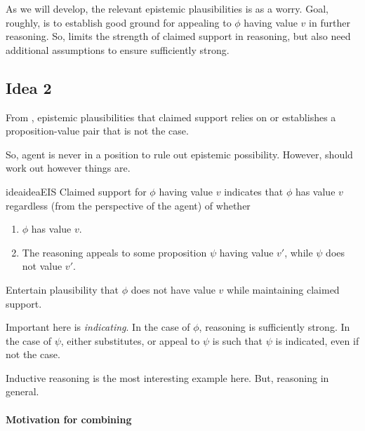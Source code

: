 \begin{note}
  As we will develop, the relevant epistemic plausibilities is as a worry.
  Goal, roughly, is to establish good ground for appealing to \(\phi\) having value \(v\) in further reasoning.
  So, \ideaCSA{} limits the strength of claimed support in reasoning, but also need additional assumptions to ensure sufficiently strong.
\end{note}

\subsection{Idea 2}
\label{sec:idea-2}

\begin{note}[]
  From \ideaCSA{}, epistemic plausibilities that claimed support relies on or establishes a proposition-value pair that is not the case.

  So, agent is never in a position to rule out epistemic possibility.
  However, should work out however things are.

  \begin{restatable}{idea}{ideaEIS}
    \label{idea:eiS}
    Claimed support for \(\phi\) having value \(v\) indicates that \(\phi\) has value \(v\) regardless (from the perspective of the agent) of whether
    \begin{enumerate}
    \item \(\phi\) has value \(v\).
    \item The reasoning appeals to some proposition \(\psi\) having value \(v'\), while \(\psi\) does not value \(v'\).
    \end{enumerate}
    \vspace{-\baselineskip}
  \end{restatable}

  Entertain plausibility that \(\phi\) does not have value \(v\) while maintaining claimed support.
\end{note}

\begin{note}
  Important here is \emph{indicating}.
  In the case of \(\phi\), reasoning is sufficiently strong.
  In the case of \(\psi\), either substitutes, or appeal to \(\psi\) is such that \(\psi\) is indicated, even if not the case.

  Inductive reasoning is the most interesting example here.
  But, reasoning in general.
\end{note}

\paragraph{Motivation for combining}

